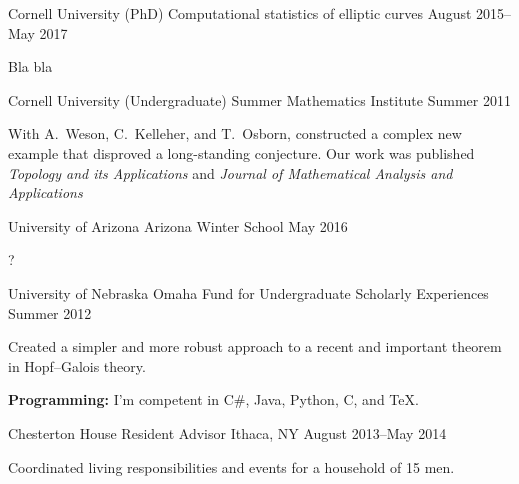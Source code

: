 \documentclass[11pt, letterpaper]{awesome-cv}
\begin{document}

\begin{cventries}

\cventry
	{Cornell University (PhD)}
	{Computational statistics of elliptic curves}
	{}
	{August 2015--May 2017}
	{
		\begin{cvitems}
			\item{Bla bla}
		\end{cvitems}
	}
	
\cventry
	{Cornell University (Undergraduate)}
	{Summer Mathematics Institute}
	{}
	{Summer 2011}
	{
		\begin{cvitems}
			\item{With A.~Weson, C.~Kelleher, and T.~Osborn, constructed a complex new example that disproved a long-standing conjecture. Our work was published \emph{Topology and its Applications} and \emph{Journal of Mathematical Analysis and Applications}}
		\end{cvitems}
	}
	
\cventry
	{University of Arizona}
	{Arizona Winter School}
	{}
	{May 2016}
	{
		\begin{cvitems}
			\item{?}
		\end{cvitems}
	}

\cventry
	{University of Nebraska Omaha}
	{Fund for Undergraduate Scholarly Experiences}
	{}
	{Summer 2012}
	{
		\begin{cvitems}
			\item{Created a simpler and more robust approach to a recent and important theorem in Hopf--Galois theory.}
		\end{cvitems}
	}
	
	
\end{cventries}






\begin{cvparagraph}

\textbf{Programming:} I'm competent in C\#, Java, Python, C, and \TeX.
\end{cvparagraph}

\begin{cventries}
\cventry
	{Chesterton House}
	{Resident Advisor}
	{Ithaca, NY}
	{August 2013--May 2014}
	{
		\begin{cvitems}
			\item{Coordinated living responsibilities and events for a household of 15 men.}
		\end{cvitems}
	}
	
\end{cventries}
\end{document}
